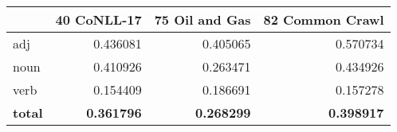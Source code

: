 \begin{tabular}{lrrr}
\toprule
{} &  40 CoNLL-17 &  75 Oil and Gas &  82 Common Crawl \\
\midrule
adj   &     0.436081 &        0.405065 &         0.570734 \\
noun  &     0.410926 &        0.263471 &         0.434926 \\
verb  &     0.154409 &        0.186691 &         0.157278 \\
\textbf{total} &     \textbf{0.361796} &        \textbf{0.268299} &         \textbf{0.398917} \\
\bottomrule
\end{tabular}
